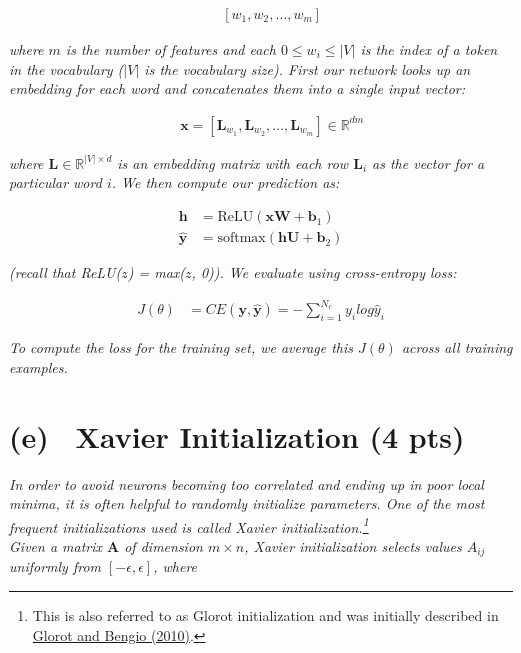 \documentclass[fleqn]{MJD}
\newcommand{\subproblem}[2]{\section{(#1)~ #2}}
\newcommand{\0}{\emptyset}
\begin{document}
\begin{align}
	&&	[w_{1}, w_{2}, \dots, w_{m}] \nonumber
\end{align}

\noindent \textit{where $m$ is the number of features and each $0 \leq w_{i} \le \vert V \vert$ is the index of a token in the vocabulary ($\vert V \vert$ is the vocabulary size). First our network looks up an embedding for each word and concatenates them into a single input vector:}

\begin{align}
	&& \bm{x} = [\bm{L}_{w_{1}}, \bm{L}_{w_{2}}, \dots, \bm{L}_{w_{m}}] \in \mathbb{R}^{dm} \nonumber
\end{align}

\noindent \textit{where $\bm{L} \in \mathbb{R}^{\vert V \vert \times d}$ is an embedding matrix with each row $\bm{L}_{i}$ as the vector for a particular word $i$. We then compute our prediction as:}

\begin{align}
	\bm{h} &= \text{ReLU}(\bm{xW} + \bm{b}_{1}) \\
	\hat{\bm{y}} &= \text{softmax}(\bm{hU} + \bm{b}_{2}) 
\end{align}

\noindent \textit{(recall that ReLU($z$) = max($z$, 0)). We evaluate using cross-entropy loss:}

\begin{align}
	J(\theta) &= CE(\bm{y}, \hat{\bm{y}}) = -\sum\limits_{i = 1}^{N_{c}} y_{i} log \hat{y}_{i}
\end{align}

\noindent \textit{To compute the loss for the training set, we average this $J(\theta)$ across all training examples.} 





\newpage
\subproblem{e}{Xavier Initialization (4 pts)}
\label{prob:2e}

\textit{In order to avoid neurons becoming too correlated and ending up in poor local minima, it is often helpful to randomly initialize parameters. One of the most frequent initializations used is called Xavier initialization.\footnote{This is also referred to as Glorot initialization and was initially described in \hyperref{http://jmlr.org/proceedings/papers/v9/glorot10a/glorot10a.pdf}{}{}{Glorot and Bengio (2010)}.}} \\

\noindent \textit{Given a matrix $\bm{A}$ of dimension $m \times n$, Xavier initialization selects values $A_{ij}$ uniformly from $[-\epsilon, \epsilon]$, where}
\end{document}
